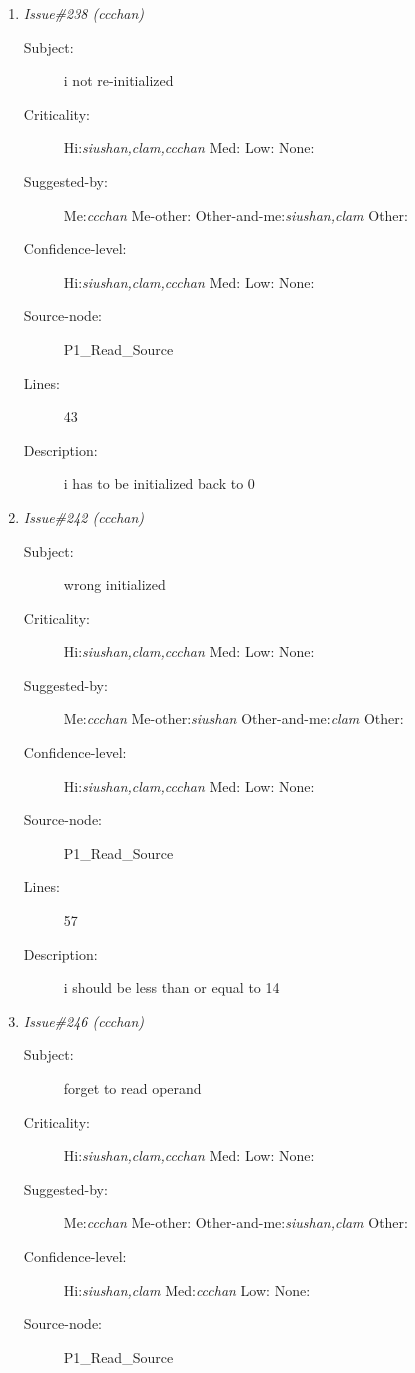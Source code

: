 \begin{enumerate}
\begin{description}
\item [Lines:] 29

\item [Description:] wrong loop condition
\end{description}
\item {\it Issue\#238 (ccchan)}
\begin{description}
\item [Subject:] i not re-initialized
\item [Criticality:] Hi:{\it siushan,clam,ccchan} Med:{\it } Low:{\it } None:{\it }
\item [Suggested-by:] Me:{\it ccchan} Me-other:{\it } Other-and-me:{\it siushan,clam} Other:{\it }
\item [Confidence-level:] Hi:{\it siushan,clam,ccchan} Med:{\it } Low:{\it } None:{\it }
\item [Source-node:] P1\_Read\_Source

\item [Lines:] 43

\item [Description:] i has to be initialized back to 0
\end{description}
\item {\it Issue\#242 (ccchan)}
\begin{description}
\item [Subject:] wrong initialized
\item [Criticality:] Hi:{\it siushan,clam,ccchan} Med:{\it } Low:{\it } None:{\it }
\item [Suggested-by:] Me:{\it ccchan} Me-other:{\it siushan} Other-and-me:{\it clam} Other:{\it }
\item [Confidence-level:] Hi:{\it siushan,clam,ccchan} Med:{\it } Low:{\it } None:{\it }
\item [Source-node:] P1\_Read\_Source

\item [Lines:] 57

\item [Description:] i should be less than or equal to 14
\end{description}
\item {\it Issue\#246 (ccchan)}
\begin{description}
\item [Subject:] forget to read operand
\item [Criticality:] Hi:{\it siushan,clam,ccchan} Med:{\it } Low:{\it } None:{\it }
\item [Suggested-by:] Me:{\it ccchan} Me-other:{\it } Other-and-me:{\it siushan,clam} Other:{\it }
\item [Confidence-level:] Hi:{\it siushan,clam} Med:{\it ccchan} Low:{\it } None:{\it }
\item [Source-node:] P1\_Read\_Source


\end{description}
\end{enumerate}

